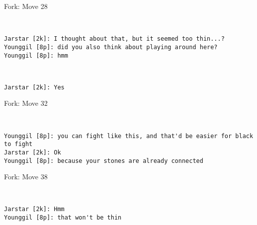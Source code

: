 \documentclass{article}
\begin{document}
\begin{subsection}{Fork: Move 28}
\begin{center}
\cleargoban
{}
\showfullgoban
\\\begin{lstlisting}
Jarstar [2k]: I thought about that, but it seemed too thin...?
Younggil [8p]: did you also think about playing around here?
Younggil [8p]: hmm
\end{lstlisting}
\end{center}
\begin{center}
\cleargoban
{}
\showfullgoban
\\\begin{lstlisting}
Jarstar [2k]: Yes
\end{lstlisting}
\end{center}
\end{subsection}
\begin{subsection}{Fork: Move 32}
\begin{center}
\cleargoban
{}
\showfullgoban
\\\begin{lstlisting}
Younggil [8p]: you can fight like this, and that'd be easier for black to fight
Jarstar [2k]: Ok
Younggil [8p]: because your stones are already connected
\end{lstlisting}
\end{center}
\end{subsection}
\begin{subsection}{Fork: Move 38}
\begin{center}
\cleargoban
{}
\showfullgoban
\\\begin{lstlisting}
Jarstar [2k]: Hmm
Younggil [8p]: that won't be thin
\end{lstlisting}
\end{center}
\end{subsection}
\end{document}

